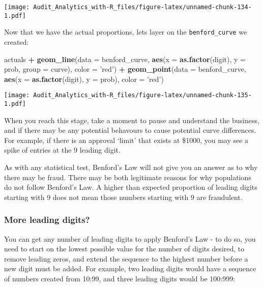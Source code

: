 \documentclass[
]{book}
\newenvironment{Shaded}{\begin{snugshade}}{\end{snugshade}}
\newcommand{\DataTypeTok}[1]{\textcolor[rgb]{0.13,0.29,0.53}{#1}}
\newcommand{\KeywordTok}[1]{\textcolor[rgb]{0.13,0.29,0.53}{\textbf{#1}}}
\newcommand{\NormalTok}[1]{#1}
\newcommand{\OperatorTok}[1]{\textcolor[rgb]{0.81,0.36,0.00}{\textbf{#1}}}
\newcommand{\StringTok}[1]{\textcolor[rgb]{0.31,0.60,0.02}{#1}}
\begin{document}
\texttt{[image: Audit\_Analytics\_with-R\_files/figure-latex/unnamed-chunk-134-1.pdf]}

Now that we have the actual proportions, lets layer on the \texttt{benford\_curve} we created:

\begin{Shaded}
\begin{Highlighting}[]
\NormalTok{actuals }\OperatorTok{+}
\StringTok{  }\KeywordTok{geom_line}\NormalTok{(}\DataTypeTok{data =}\NormalTok{ benford_curve, }\KeywordTok{aes}\NormalTok{(}\DataTypeTok{x =} \KeywordTok{as.factor}\NormalTok{(digit), }\DataTypeTok{y =}\NormalTok{ prob, }\DataTypeTok{group =}\NormalTok{ curve), }\DataTypeTok{color =} \StringTok{'red'}\NormalTok{) }\OperatorTok{+}\StringTok{ }
\StringTok{  }\KeywordTok{geom_point}\NormalTok{(}\DataTypeTok{data =}\NormalTok{ benford_curve, }\KeywordTok{aes}\NormalTok{(}\DataTypeTok{x =} \KeywordTok{as.factor}\NormalTok{(digit), }\DataTypeTok{y =}\NormalTok{ prob), }\DataTypeTok{color =} \StringTok{'red'}\NormalTok{)}
\end{Highlighting}
\end{Shaded}

\texttt{[image: Audit\_Analytics\_with-R\_files/figure-latex/unnamed-chunk-135-1.pdf]}

When you reach this stage, take a moment to pause and understand the business, and if there may be any potential behavours to cause potential curve differences. For example, if there is an approval `limit' that exists at \$1000, you may see a spike of entries at the 9 leading digit.

As with any statistical test, Benford's Law will not give you an answer as to why there may be fraud. There may be both legitimate reasons for why populations do not follow Benford's Law. A higher than expected proportion of leading digits starting with 9 does not mean those numbers starting with 9 are fraudulent.

\hypertarget{more-leading-digits}{%
\subsubsection{More leading digits?}\label{more-leading-digits}}

You can get any number of leading digits to apply Benford's Law - to do so, you need to start on the lowest possible value for the number of digits desired, to remove leading zeros, and extend the sequence to the highest number before a new digit must be added. For example, two leading digits would have a sequence of numbers created from 10:99, and three leading digits would be 100:999:
\end{document}
